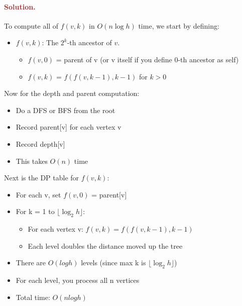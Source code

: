 \paragraph{\textcolor{brown}{Solution.}}
To compute all of $f(v, k)$ in $O(n \log h)$ time, we start by defining:
\begin{itemize} \item $f(v, k)$: The $2^k$-th ancestor of $v$. \begin{itemize} \item $f(v,0)$ = parent of v (or v itself if you define 0-th ancestor as self) \item $f(v,k)$ = $f(f(v,k-1),k-1)$ for $k > 0$ \end{itemize} \end{itemize} 
Now for the depth and parent computation: \begin{itemize} \item Do a DFS or BFS from the root \item Record parent[v] for each vertex v \item Record depth[v] \item This takes $O(n)$ time \end{itemize}
Next is the DP table for $f(v,k)$: \begin{itemize} \item For each v, set $f(v,0)$ = parent[v] \item For k = 1 to $\lfloor \log_2 h \rfloor$: \begin{itemize} \item For each vertex v: $f(v,k) = f(f(v,k-1),k-1)$ \item Each level doubles the distance moved up the tree \end{itemize} \item There are $O(logh)$ levels (since max k is $\lfloor \log_2 h \rfloor$) \item For each level, you process all n vertices \item Total time: $O(nlogh)$ \end{itemize}  
